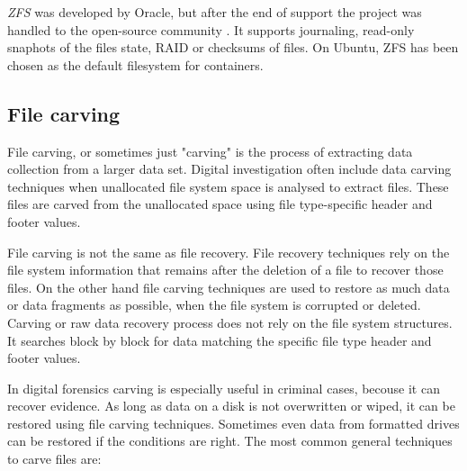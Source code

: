 \documentclass{acm_proc_article-sp}
\begin{document}
{\it ZFS} \cite{zfs} was developed by Oracle, but after the end of support the project was handled to the open-source community \cite{openzfs}. It supports journaling, read-only snaphots of the files state, RAID or checksums of files. On Ubuntu, ZFS has been chosen as the default filesystem for containers.

\subsection{File carving}

File carving, or sometimes just "carving" is the process of extracting data collection from a larger data set. Digital investigation often include data carving techniques when unallocated file system space is analysed to extract files. These files are carved from the unallocated space using file type-specific header and footer values.

File carving is not the same as file recovery. File recovery techniques rely on the file system information that remains after the deletion of a file to recover those files. On the other hand file carving techniques are used to restore as much data or data fragments as possible, when the file system is corrupted or deleted. Carving or raw data recovery process does not rely on the file system structures. It searches block by block for data matching the specific file type header and footer values. 

In digital forensics carving is especially useful in criminal cases, becouse it can recover evidence. As long as data on a disk is not overwritten or wiped, it can be restored using file carving techniques. Sometimes even data from formatted drives can be restored if the conditions are right. The most common general techniques to carve files are:
\end{document}
